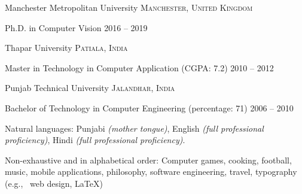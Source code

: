 \documentclass[10pt,a4paper]{article} %
\begin{document}
	
	\headedsection %
	{Manchester Metropolitan University}
	{\textsc{Manchester, United Kingdom}} {
		
		\headedsubsection %
		{Ph.D. in Computer Vision}
		{2016 -- 2019}
		
	}
	
	
	\headedsection %
	{Thapar University}
	{\textsc{Patiala, India}} {
		
		\headedsubsection %
		{Master in Technology in Computer Application \textnormal{(CGPA: 7.2)}}
		{2010 -- 2012} {}
	}
	
	
	\headedsection %
	{Punjab Technical University}
	{\textsc{Jalandhar, India}} {
		
		\headedsubsection %
		{Bachelor of Technology in Computer Engineering \textnormal{(percentage: 71)}}
		{2006 -- 2010} {}
	}
	
	
	
	\inlineheadsection %
	{Natural languages:}
	{Punjabi \textit{(mother tongue)}, English \textit{(full professional proficiency)}, Hindi \textit{(full professional proficiency)}.}
	
	
	
	
	\spacedhrule{1.6em}{-0.4em} %
	
	
	
	\inlineheadsection %
	{Non-exhaustive and in alphabetical order:}
	{Computer games, cooking, football, music, mobile applications, philosophy, software engineering, travel, typography (e.g., \ web design, \LaTeX)}
	
\end{document}
